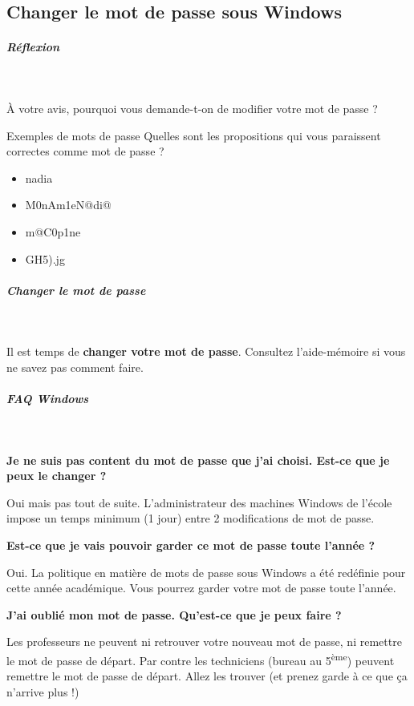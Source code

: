 \documentclass[a4paper,11pt]{article}
\begin{document}
\subsection{Changer le mot de passe sous Windows}


\subparagraph{Réflexion}
\textcolor{white}{.} 
\par
				
\`A votre avis, pourquoi vous demande-t-on de modifier votre mot de passe ?
				
\par
			
\begin{Exercice}{Exemples de mots de passe} 		
Quelles sont les propositions qui vous paraissent correctes comme mot de passe ?
\begin{itemize} 
  \item[ \ding{"6F} ] nadia
  \item[ \ding{"6F} ] M0nAm1eN@di@
  \item[ \ding{"6F} ] m@C0p1ne
  \item[ \ding{"6F} ] GH5).jg
 \end{itemize} 
\end{Exercice} 
 
\subparagraph{Changer le mot de passe} 
		
\textcolor{white}{.} 
\par
				
\par
        
Il est  temps de \textbf{changer votre mot de passe}. Consultez l'aide-m\'emoire si vous ne savez pas comment faire. 
				
\par
        
			
\subparagraph{FAQ Windows} 
		
\textcolor{white}{.} \par
				
 \par
 \textbf{Je ne suis pas content du mot de passe que j'ai choisi. Est-ce que je peux le changer ?}
 \par
Oui mais pas tout de suite. L'administrateur des machines Windows de l'\'ecole impose un temps minimum (1 jour) entre 2 modifications de mot de passe.
 \par
 \textbf{Est-ce que je vais pouvoir garder ce mot de passe toute l'ann\'ee ?}
\par
Oui. La politique en matière de mots de passe sous Windows a été redéfinie pour cette année académique. Vous pourrez garder votre mot de passe toute l'année.
\par
 \textbf{J'ai oubli\'e mon mot de passe. Qu'est-ce que je peux faire ?}
 \par
 Les professeurs ne peuvent ni retrouver votre nouveau mot de passe, ni remettre le mot de passe de d\'epart. Par contre les techniciens (bureau au 5\textsuperscript{\`eme}) peuvent remettre le mot de passe de d\'epart. Allez les trouver (et prenez garde \`a ce que \c ca n'arrive plus !)
 \par
\end{document}
